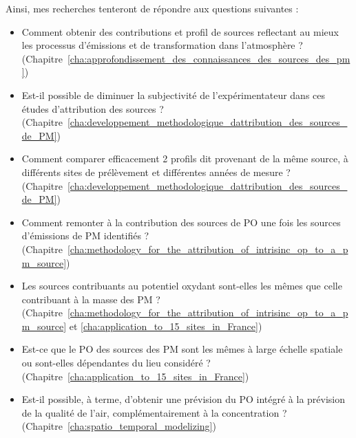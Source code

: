 Ainsi, mes recherches tenteront de répondre aux questions suivantes :
\begin{itemize}
    \item Comment obtenir des contributions et profil de sources reflectant au mieux les
        processus d'émissions et de transformation dans l'atmosphère ?
        (Chapitre~\ref{cha:approfondissement_des_connaissances_des_sources_des_pm})
    \item Est-il possible de diminuer la subjectivité de l'expérimentateur dans ces
        études d'attribution des sources ?
        (Chapitre~\ref{cha:developpement_methodologique_dattribution_des_sources_de_PM})
    \item Comment comparer efficacement 2 profils dit provenant de la même source, à
        différents sites de prélèvement et différentes années de mesure ?
        (Chapitre~\ref{cha:developpement_methodologique_dattribution_des_sources_de_PM})
    \item Comment remonter à la contribution des sources de PO une fois les sources
        d'émissions de PM identifiés ?
        (Chapitre~\ref{cha:methodology_for_the_attribution_of_intrisinc_op_to_a_pm_source})
    \item Les sources contribuants au potentiel oxydant sont-elles les mêmes que celle
        contribuant à la masse des PM ?
        (Chapitre~\ref{cha:methodology_for_the_attribution_of_intrisinc_op_to_a_pm_source}
        et \ref{cha:application_to_15_sites_in_France})
    \item Est-ce que le PO des sources des PM sont les mêmes à large échelle spatiale ou
        sont-elles dépendantes du lieu considéré ?
        (Chapitre~\ref{cha:application_to_15_sites_in_France})
    \item Est-il possible, à terme, d'obtenir une prévision du PO intégré à la prévision de la
        qualité de l'air, complémentairement à la concentration ?
        (Chapitre~\ref{cha:spatio_temporal_modelizing})
\end{itemize}


\printbibliography[segment=\therefsegment,heading=subbibliography]


